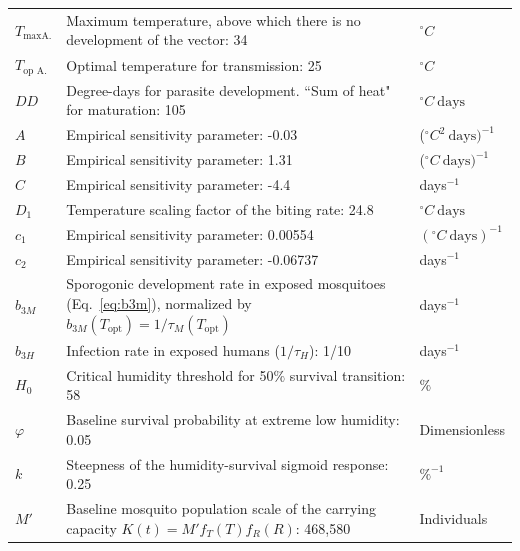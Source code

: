 \documentclass[a4paper,fleqn]{cas-dc}
\begin{document}
\begin{table}[width=2.0\linewidth,cols=3,pos=h]
\begin{threeparttable}
\begin{tabular*}{\tblwidth}{@{} LLL@{} }
$T_{\max\text{A.}}$ & Maximum temperature, above which there is no development of the vector: 34  \cite{brierre_function_development_rate, climate_based_distribution_sub_sahara, minmax_temp_anoph} & $^\circ C$ \\
$T_{\mathrm{op}\text{ A.}}$ & Optimal temperature for transmission: 25  \cite{brierre_function_development_rate} & $^\circ C$ \\
$DD$  & Degree-days for parasite development.
             ``Sum of heat" for maturation: 105 \cite{McCord2016, Lindsay_Birley_1996} & $^\circ C \ \text{days}$ \\ 
$A$  & Empirical sensitivity parameter: -0.03 & ($^\circ C^2 \ \text{days})^{-1}$ \\ 
$B$  & Empirical sensitivity parameter: 1.31 & ($^\circ C \ \text{days})^{-1}$ \\ 
$C$  & Empirical sensitivity parameter: -4.4 & days$^{-1}$ \\ 
$D_1$  & Temperature scaling factor of the biting rate: 24.8 & $^\circ C \ \text{days}$ \\ 
$c_1$  & Empirical sensitivity parameter: 0.00554 & $(^\circ C \ \text{days})^{-1}$ \\ 
$c_2$  & Empirical sensitivity parameter: -0.06737 & days$^{-1}$ \\ 
$b_{3M}$  & Sporogonic development rate in exposed mosquitoes (Eq.~\ref{eq:b3m}), normalized by $b_{3M}(T_{\mathrm{opt}})=1/\tau_M(T_{\mathrm{opt}})$  &  days$^{-1}$ \\
$b_{3H}$  & Infection rate in exposed humans ($1/\tau_H$): 1/10 &  days$^{-1}$ \\  
$H_0$ & Critical humidity threshold for 50$\%$ survival transition: 58 & $\%$ \\
$\varphi$ &  Baseline survival probability at extreme low humidity: 0.05 & Dimensionless \\
$k$  & Steepness of the humidity-survival sigmoid response: 0.25 & $\%^{-1}$ \\
$M'$ & Baseline mosquito population scale of the carrying capacity $K(t) = M' f_T(T) f_R(R)$: 468{,}580  & Individuals \\



\end{tabular*}
\end{threeparttable}
\end{table}
\end{document}
